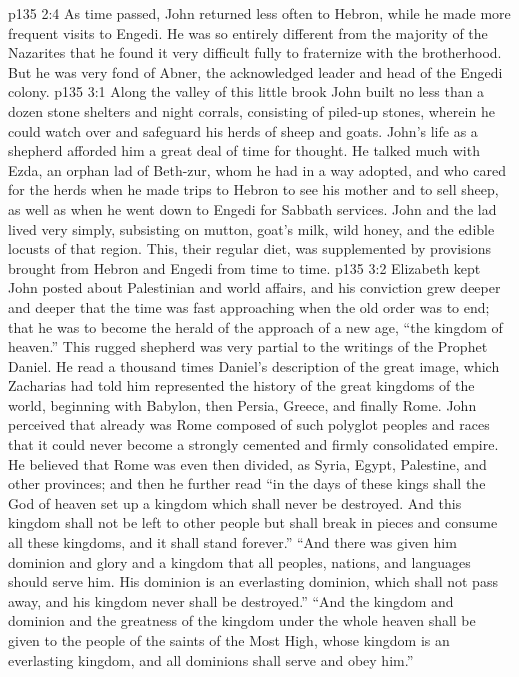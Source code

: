 \vs p135 2:4 As time passed, John returned less often to Hebron, while he made more frequent visits to Engedi. He was so entirely different from the majority of the Nazarites that he found it very difficult fully to fraternize with the brotherhood. But he was very fond of Abner, the acknowledged leader and head of the Engedi colony.
\vs p135 3:1 Along the valley of this little brook John built no less than a dozen stone shelters and night corrals, consisting of piled\hyp{}up stones, wherein he could watch over and safeguard his herds of sheep and goats. John’s life as a shepherd afforded him a great deal of time for thought. He talked much with Ezda, an orphan lad of Beth\hyp{}zur, whom he had in a way adopted, and who cared for the herds when he made trips to Hebron to see his mother and to sell sheep, as well as when he went down to Engedi for Sabbath services. John and the lad lived very simply, subsisting on mutton, goat’s milk, wild honey, and the edible locusts of that region. This, their regular diet, was supplemented by provisions brought from Hebron and Engedi from time to time.
\vs p135 3:2 \pc Elizabeth kept John posted about Palestinian and world affairs, and his conviction grew deeper and deeper that the time was fast approaching when the old order was to end; that he was to become the herald of the approach of a new age, “the kingdom of heaven.” This rugged shepherd was very partial to the writings of the Prophet Daniel. He read a thousand times Daniel’s description of the great image, which Zacharias had told him represented the history of the great kingdoms of the world, beginning with Babylon, then Persia, Greece, and finally Rome. John perceived that already was Rome composed of such polyglot peoples and races that it could never become a strongly cemented and firmly consolidated empire. He believed that Rome was even then divided, as Syria, Egypt, Palestine, and other provinces; and then he further read “in the days of these kings shall the God of heaven set up a kingdom which shall never be destroyed. And this kingdom shall not be left to other people but shall break in pieces and consume all these kingdoms, and it shall stand forever.” “And there was given him dominion and glory and a kingdom that all peoples, nations, and languages should serve him. His dominion is an everlasting dominion, which shall not pass away, and his kingdom never shall be destroyed.” “And the kingdom and dominion and the greatness of the kingdom under the whole heaven shall be given to the people of the saints of the Most High, whose kingdom is an everlasting kingdom, and all dominions shall serve and obey him.”

